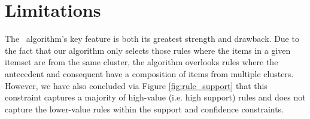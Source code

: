 \section{Limitations}
The \algo\ algorithm's key feature is both its greatest strength and drawback. Due to the fact that our algorithm only selects those rules where the items in a given itemset are from the same cluster, the algorithm overlooks rules where the antecedent and consequent have a composition of items from multiple clusters. However, we have also concluded via Figure \ref{fig:rule_support} that this constraint captures a majority of high-value (i.e. high support) rules and does not capture the lower-value rules within the support and confidence constraints.